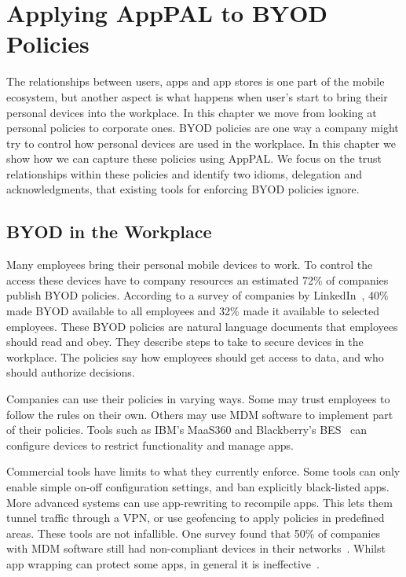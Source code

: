 \documentclass[thesis.tex]{subfiles}
\begin{document}
\chapter{Applying AppPAL to BYOD Policies}
\label{chap:byod}

The relationships between users, apps and app stores is one part of
the mobile ecosystem, but another aspect is what happens when user's
start to bring their personal devices into the workplace.  In this
chapter we move from looking at personal policies to corporate ones.
BYOD policies are one way a company might try to control how personal
devices are used in the workplace.  In this chapter we show how we can
capture these policies using AppPAL.  We focus on the trust
relationships within these policies and identify two idioms,
delegation and acknowledgments, that existing tools for enforcing BYOD
policies ignore.

\section{BYOD in the Workplace}

Many employees bring their personal mobile devices to work. To control
the access these devices have to company resources an estimated 72\%
of companies publish \ac{BYOD} policies. According to a survey of
companies by LinkedIn~\cite{schulze_byod_2016}, 40\% made \ac{BYOD}
available to all employees and 32\% made it available to selected
employees. These \ac{BYOD} policies are natural language documents
that employees should read and obey. They describe steps to take to
secure devices in the workplace. The policies say how employees should
get access to data, and who should authorize decisions.

Companies can use their policies in varying ways. Some may
trust employees to follow the rules on their own. Others may use
\ac{MDM} software to implement part of their policies. Tools such as
IBM's MaaS360 and Blackberry's BES~\cite{ibm_ibm_nodate,blackberry_secure_nodate} can
configure devices to restrict functionality and manage apps.

Commercial tools have limits to what they currently enforce. Some
tools can only enable simple on-off configuration settings, and ban
explicitly black-listed apps. More advanced systems can use
app-rewriting to recompile apps. This lets them tunnel traffic through a VPN, or use
geofencing to apply policies in predefined areas. These tools are not
infallible. One survey found that 50\% of companies with \ac{MDM}
software still had non-compliant devices in their
networks~\cite{mobileiron_security_labs_q4_2015}. Whilst app wrapping
can protect some apps, in general it is
ineffective~\cite{hao_effectiveness_2013}.
\end{document}
